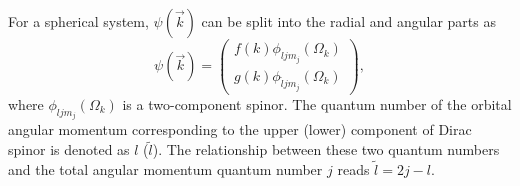 \documentclass[twocolumn,prc,preprintnumbers,superscriptaddress,floatfix,showpacs]{revtex4}
\begin{document}
For a spherical system, $\psi(\vec{k})$ can be split into the radial and angular parts as
\begin{equation}\label{wave function}
\psi ( \vec{k}) =\left(
\begin{array}{c}
f(k)\phi _{ljm_{j}}\left( \Omega _{k}\right) \\
g(k)\phi _{\tilde{l}jm_{j}}\left( \Omega _{k}\right)
\end{array}
\right) ,
\end{equation}
where $\phi _{ljm_{j}}\left(\Omega _{k}\right)$ is a two-component spinor. The quantum number of the orbital angular momentum corresponding to the upper (lower) component of Dirac spinor is denoted as $l$ ($\tilde{l}$). The relationship between these two quantum numbers and the total angular momentum quantum number $j$ reads $\tilde{l}=2j-l$.
\end{document}
